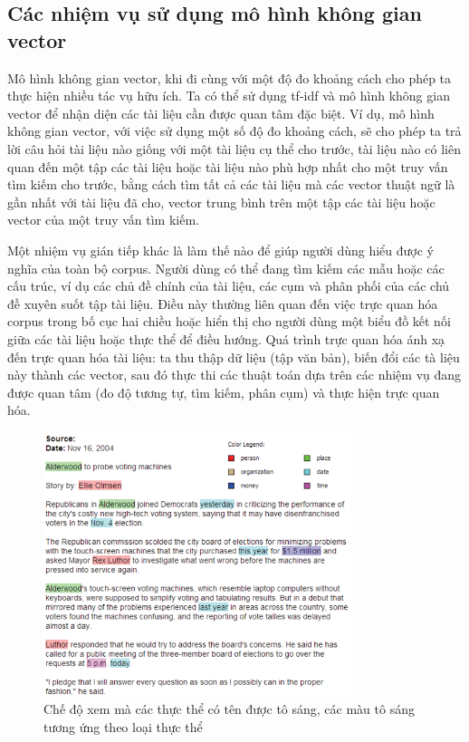 \documentclass[14pt, a4paper]{article}
\numberwithin{equation}{section}
\numberwithin{figure}{section}
\numberwithin{dl}{section}
\numberwithin{md}{section}
\numberwithin{bd}{section}
\numberwithin{dn}{section}
\numberwithin{hq}{section}
\begin{document}
    \subsection{Các nhiệm vụ sử dụng mô hình không gian vector}

    Mô hình không gian vector, khi đi cùng với một độ đo khoảng cách cho phép ta thực hiện nhiều tác vụ hữu ích.
    Ta có thể sử dụng tf-idf và mô hình không gian vector để nhận diện các tài liệu cần được quan tâm đặc biệt.
    Ví dụ, mô hình không gian vector, với việc sử dụng một số độ đo khoảng cách, sẽ cho phép ta trả lời câu hỏi tài liệu nào giống với một tài liệu cụ thể cho trước,
    tài liệu nào có liên quan đến một tập các tài liệu hoặc tài liệu nào phù hợp nhất cho một truy vấn tìm kiếm cho trước,
    bằng cách tìm tất cả các tài liệu mà các vector thuật ngữ là gần nhất với tài liệu đã cho, vector trung bình trên một tập các tài liệu hoặc vector của một truy vấn tìm kiếm.

    Một nhiệm vụ gián tiếp khác là làm thế nào để giúp người dùng hiểu được ý nghĩa của toàn bộ corpus.
    Người dùng có thể đang tìm kiếm các mẫu hoặc các cấu trúc, ví dụ các chủ đề chính của tài liệu, các cụm và phân phối của các chủ đề xuyên suốt tập tài liệu.
    Điều này thường liên quan đến việc trực quan hóa corpus trong bố cục hai chiều hoặc hiển thị cho người dùng một biểu đồ kết nối giữa các tài liệu hoặc thực thể để điều hướng.
    Quá trình trực quan hóa ánh xạ đến trực quan hóa tài liệu: ta thu thập dữ liệu (tập văn bản),
    biến đổi các tà liệu này thành các vector, sau đó thực thi các thuật toán dựa trên các nhiệm vụ đang được quan tâm (đo độ tương tự, tìm kiếm, phân cụm) và thực hiện trực quan hóa.

    \begin{figure}[h!]
        \centering
        \includegraphics[width=0.8\textwidth]{3.png}
        \caption{Chế độ xem mà các thực thể có tên được tô sáng, các màu tô sáng tương ứng theo loại thực thể}
        \label{fig:3}
    \end{figure}
\end{document}
